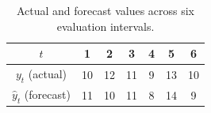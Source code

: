 \begin{table}[h!]
\centering
\begin{tabular}{c|cccccc}
\hline
$t$ & 1 & 2 & 3 & 4 & 5 & 6 \\ \hline
$y_t$ (actual)        & 10 & 12 & 11 & 9 & 13 & 10 \\
$\hat{y}_t$ (forecast) & 11 & 10 & 11 & 8 & 14 & 9 \\ \hline
\end{tabular}
\caption{Actual and forecast values across six evaluation intervals.}
\label{tab:frs_example_y}
\end{table}
